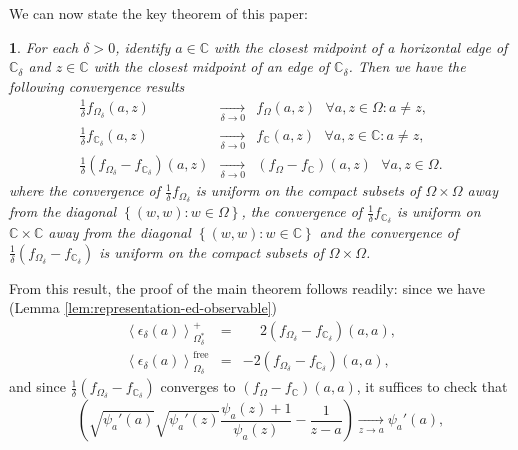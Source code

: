 \documentclass[oneside,english]{amsart}
\numberwithin{equation}{section}
\numberwithin{figure}{section}
\theoremstyle{plain}
\theoremstyle{plain}
\newtheorem{thm}{\protect\theoremname}
\theoremstyle{plain}
\theoremstyle{plain}
\theoremstyle{plain}
\theoremstyle{definition}
\theoremstyle{remark}
\providecommand{\theoremname}{Theorem}
\providecommand{\theoremname}{Theorem}
\begin{document}
We can now state the key theorem of this paper:
\begin{thm}
\label{thm:key-thm}For each $\delta>0$, identify $a\in\mathbb{C}$
with the closest midpoint of a horizontal edge of $\mathbb{C}_{\delta}$
and $z\in\mathbb{C}$ with the closest midpoint of an edge of $\mathbb{C}_{\delta}$.
Then we have the following convergence results
\begin{eqnarray*}
\frac{1}{\delta}f_{\Omega_{\delta}}\left(a,z\right) & \underset{\delta\to0}{\longrightarrow} & f_{\Omega}\left(a,z\right)\,\,\,\,\forall a,z\in\Omega:a\neq z,\\
\frac{1}{\delta}f_{\mathbb{C}_{\delta}}\left(a,z\right) & \underset{\delta\to0}{\longrightarrow} & f_{\mathbb{C}}\left(a,z\right)\,\,\,\,\forall a,z\in\mathbb{C}:a\neq z,\\
\frac{1}{\delta}\left(f_{\Omega_{\delta}}-f_{\mathbb{C}_{\delta}}\right)\left(a,z\right) & \underset{\delta\to0}{\longrightarrow} & \left(f_{\Omega}-f_{\mathbb{C}}\right)\left(a,z\right)\,\,\,\,\forall a,z\in\Omega.
\end{eqnarray*}
where the convergence of $\frac{1}{\delta}f_{\Omega_{\delta}}$ is
uniform on the compact subsets of $\Omega\times\Omega$ away from
the diagonal $\left\{ \left(w,w\right):w\in\Omega\right\} $, the
convergence of $\frac{1}{\delta}f_{\mathbb{C}_{\delta}}$ is uniform
on $\mathbb{C}\times\mathbb{C}$ away from the diagonal $\left\{ \left(w,w\right):w\in\mathbb{C}\right\} $
and the convergence of $\frac{1}{\delta}\left(f_{\Omega_{\delta}}-f_{\mathbb{C}_{\delta}}\right)$
is uniform on the compact subsets of $\Omega\times\Omega$.
\end{thm}
From this result, the proof of the main theorem follows readily: since
we have (Lemma \ref{lem:representation-ed-observable}) 
\begin{eqnarray*}
\left\langle \epsilon_{\delta}\left(a\right)\right\rangle _{\Omega_{\delta}^{*}}^{+} & = & \phantom{-}2\left(f_{\Omega_{\delta}}-f_{\mathbb{C}_{\delta}}\right)\left(a,a\right),\\
\left\langle \epsilon_{\delta}\left(a\right)\right\rangle _{\Omega_{\delta}}^{\mathrm{free}} & = & -2\left(f_{\Omega_{\delta}}-f_{\mathbb{C}_{\delta}}\right)\left(a,a\right),
\end{eqnarray*}
and since $\frac{1}{\delta}\left(f_{\Omega_{\delta}}-f_{\mathbb{C}_{\delta}}\right)$
converges to $\left(f_{\Omega}-f_{\mathbb{C}}\right)\left(a,a\right)$,
it suffices to check that
\[
\left(\sqrt{\psi_{a}'\left(a\right)}\sqrt{\psi_{a}'\left(z\right)}\frac{\psi_{a}\left(z\right)+1}{\psi_{a}\left(z\right)}-\frac{1}{z-a}\right)\underset{z\to a}{\longrightarrow}\psi_{a}'\left(a\right),
\]
\end{document}
